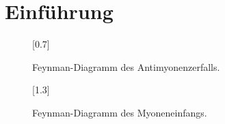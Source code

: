 \section{Einführung}
	
		\begin{figure}[Ht]
			\centering
			\scalebox{0.7}[0.7]{
			
			}
			\label{fig:myonzerfall}
			\caption{Feynman-Diagramm des Antimyonenzerfalls.}
		\end{figure}
	
		\begin{figure}[Ht]
			\centering
			\scalebox{1.3}[1.3]{
			
			}
			\label{fig:myoneinfang}
			\caption{Feynman-Diagramm des Myoneneinfangs.}
		\end{figure}
